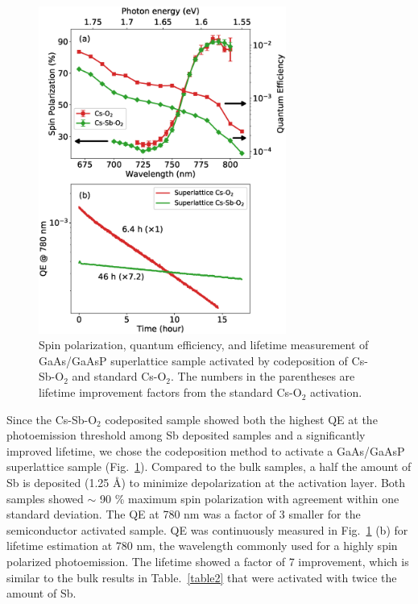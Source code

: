 
\begin{figure}
	\centering
	\includegraphics*[width=230pt]{figs/CsSbO/sl.eps}
	\caption{Spin polarization, quantum efficiency, and lifetime measurement of GaAs/GaAsP superlattice sample activated by codeposition of Cs-Sb-O$_2$ and standard Cs-O$_2$. The numbers in the parentheses are lifetime improvement factors from the standard Cs-O$_2$ activation.}
	\label{fig_superlattice}
	
\end{figure}

Since the Cs-Sb-O$_2$ codeposited sample showed both the highest QE at the photoemission threshold among Sb deposited samples and  a significantly improved lifetime, we chose the codeposition method to activate a GaAs/GaAsP superlattice sample\cite{maruyama2004} (Fig.~\ref{fig_superlattice}). Compared to the bulk samples, a half the amount of Sb is deposited (1.25 \AA) to minimize depolarization at the activation layer.\cite{cultrera2020_LongLifetimePolarized} Both samples showed $\sim$ 90 \% maximum spin polarization with agreement within one standard deviation. The QE at 780 nm was a factor of 3 smaller for the semiconductor activated sample. QE was continuously measured in Fig.~\ref{fig_superlattice} (b) for lifetime estimation at 780 nm, the wavelength commonly used for a highly spin polarized photoemission.
The lifetime showed a factor of 7 improvement, which is similar to the bulk results in Table.~\ref{table2} that were activated with twice the amount of Sb.



